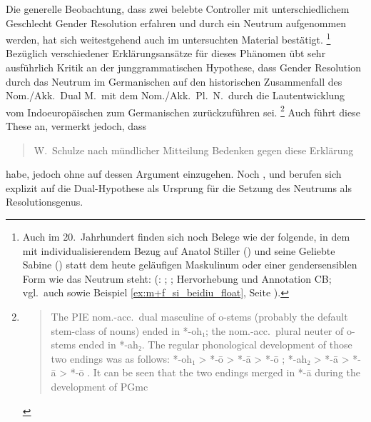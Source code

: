 Die generelle Beobachtung, dass zwei belebte Controller mit unterschiedlichem
Geschlecht Gender Resolution erfahren und durch ein Neutrum aufgenommen werden,
hat sich weitestgehend auch im untersuchten Material bestätigt.%
%
	\footnote{Auch im 20.~Jahrhundert finden sich noch
		Belege wie der folgende, in dem mit individualisierendem Bezug auf
		Anatol Stiller (\MascM) und seine Geliebte Sabine (\FemF) statt dem
		heute geläufigen Maskulinum oder einer gendersensiblen Form wie
		 das Neutrum steht:  (:
		; \cite[332--333]{frisch:stiller}; Hervorhebung und
		Annotation CB; vgl.~auch \cite[188]{dal2014} sowie Beispiel
		\ref{ex:m+f_si_beidiu_float}, Seite \pageref{ex:m+f_si_beidiu_float}).
	}
%
Bezüglich verschiedener Erklärungs\-ansätze für dieses Phänomen übt
\citet[213--221]{askedal1973} sehr ausführlich Kritik an der junggrammatischen
Hypothese, dass Gender Resolution durch das Neutrum im Germanischen auf den
historischen Zusammenfall des Nom./Akk.\ Dual M.\ mit dem Nom./Akk.~Pl.~N.\
durch die Laut\-entwicklung vom Indoeuropäischen zum Germanischen
zurückzuführen sei.%
%
	\footnote{\foreignblockcquote{english}[196]{ringe2017}{The PIE nom.-acc.\
		dual masculine of o-stems (probably the default stem-class of nouns)
		ended in *-oh₁; the nom.-acc.\ plural neuter of o-stems ended in *-ah₂.
		The regular phonological development of those two endings was as
		follows: *-oh₁ > *-ō \textelp{} > *-ā > *-ō \textelp{}; *-ah₂ > *-ā
		\textelp{} > *-ā > *-ō \textelp{}. It can be seen that the two endings
		merged in *-ā during the development of PGmc}.%
	}
%
Auch \citeauthor{behaghel1928} führt diese These an, vermerkt jedoch, dass
\blockcquote[40]{behaghel1928}{W.~Schulze \textelp{} nach mündlicher Mitteilung
Bedenken gegen diese Erklärung} habe, jedoch ohne auf dessen Argument
einzugehen. Noch \citet[157]{hock2008}, \citet[196]{ringe2017} und
\citet[104]{miller2019} berufen sich explizit auf die Dual-Hypothese als
Ursprung für die Setzung des Neutrums als Resolutionsgenus.

